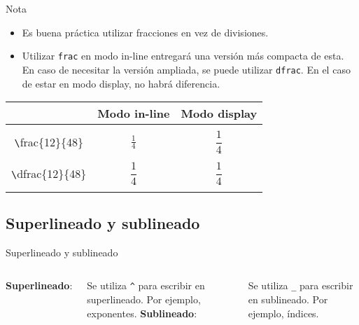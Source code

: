 \documentclass[../slides.tex]{subfiles}
\begin{document}
    \begin{frame}
        \begin{block}{Nota}
            \begin{itemize}
                \item Es buena práctica utilizar fracciones en vez de divisiones.
                \item Utilizar \texttt{frac} en modo in-line entregará una versión más compacta de esta. En caso de necesitar la versión ampliada, se puede utilizar \texttt{dfrac}. En el caso de estar en modo display, no habrá diferencia.
            \end{itemize}
        \end{block}
        \begin{center}
           \begin{tabular}{|c|c|c|}
             \hline
                 & Modo in-line & Modo display\\
            \hline
                & & \\
                 \texttt \textbackslash frac\{12\}\{48\} & $\quad\quad\frac{1}{4}\quad\quad$ & $\quad\quad\dfrac{1}{4}\quad\quad$ \\
                        & & \\
                \texttt \textbackslash dfrac\{12\}\{48\} & $\quad\quad\dfrac{1}{4}\quad\quad$ & $\quad\quad\dfrac{1}{4}\quad\quad$ \\
                        & & \\
              \hline
          \end{tabular}
        \end{center}
    \end{frame}
    \subsection{Superlineado y sublineado}

    \begin{frame}{Superlineado y sublineado}
        \begin{columns}[t]
                \textbf{Superlineado}: 

                Se utiliza \texttt{\^} para escribir en superlineado. Por ejemplo, exponentes.
                \textbf{Sublineado}: 

                Se utiliza \texttt{\_} para escribir en sublineado. Por ejemplo, índices.
        \end{columns}
    \end{frame}
    
\end{document}
